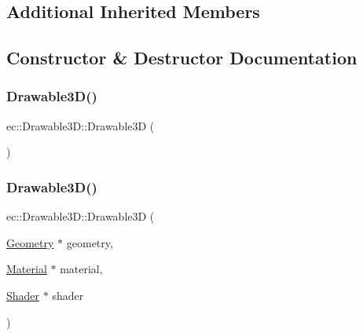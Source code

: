 \subsection*{Additional Inherited Members}


\subsection{Constructor \& Destructor Documentation}
\mbox{\label{classec_1_1_drawable3_d_a35d0247d9c581d07fb1c231acf4c6b75}} 
\subsubsection{\texorpdfstring{Drawable3\+D()}{Drawable3D()}\hspace{0.1cm}{\footnotesize\ttfamily [1/2]}}
{\footnotesize\ttfamily ec\+::\+Drawable3\+D\+::\+Drawable3D (\begin{DoxyParamCaption}{ }\end{DoxyParamCaption})\hspace{0.3cm}{\ttfamily [explicit]}}

\mbox{\label{classec_1_1_drawable3_d_a3a63fabef637d7e055559944579194d7}} 
\subsubsection{\texorpdfstring{Drawable3\+D()}{Drawable3D()}\hspace{0.1cm}{\footnotesize\ttfamily [2/2]}}
{\footnotesize\ttfamily ec\+::\+Drawable3\+D\+::\+Drawable3D (\begin{DoxyParamCaption}\item[{\mbox{\hyperlink{classec_1_1_geometry}{Geometry}} $\ast$}]{geometry,  }\item[{\mbox{\hyperlink{classec_1_1_material}{Material}} $\ast$}]{material,  }\item[{\mbox{\hyperlink{classec_1_1_shader}{Shader}} $\ast$}]{shader }\end{DoxyParamCaption})\hspace{0.3cm}{\ttfamily [explicit]}}

